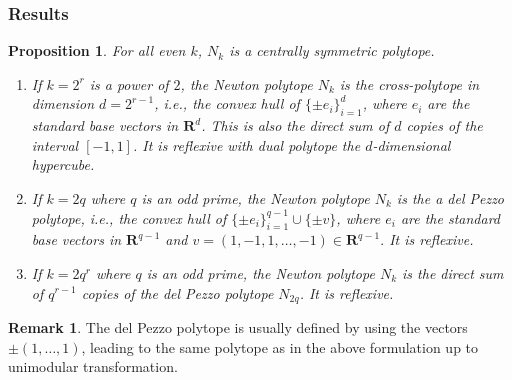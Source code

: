 \documentclass[12pt,reqno]{amsart}
\theoremstyle{definition}
\theoremstyle{plain}
\newtheorem{proposition}[theorem]{Proposition}
\theoremstyle{definition}
\newtheorem{remark}[theorem]{Remark}
\newcommand{\R}{\mathbf{R}}
\begin{document}
\subsubsection*{Results} 

\begin{proposition} \label{polNk} For all even $k$, $N_k$ is a centrally symmetric polytope. 
\begin{enumerate} 
\item If $k=2^r$ is a power of $2$, the Newton polytope $N_k$ is the \emph{cross-polytope} in dimension $d=2^{r-1}$, i.e., the convex hull of $\{\pm e_i\}_ {i=1}^{d}$, where $e_i$ are the standard base vectors in $\R^d$. This is also the direct sum of $d$ copies of the interval $[-1,1]$. It is reflexive with dual polytope the $d$-dimensional hypercube. 

\item \label{DPpol} If $k=2q$ where $q$ is an odd prime, the Newton polytope $N_k$ is the a \emph{del Pezzo polytope}, i.e., the convex hull of $\{\pm e_i\}_ {i=1}^{q-1} \cup \{\pm v\}$, where $e_i$ are the standard base vectors in $\R^{q-1}$ and $v=(1,-1,1,\dots,-1) \in \R^{q-1}.$  It is reflexive. 

\item \label{polNksum} If $k=2q^r$ where $q$ is an odd prime, the Newton polytope $N_k$ is the direct sum of $q^{r-1}$ copies of the del Pezzo polytope $N_{2q}$.  It is reflexive. 
\end{enumerate} 
\end{proposition} 

\begin{remark} 
The del Pezzo polytope is usually defined by using the vectors $\pm(1,\dots,1)$, leading to the same polytope as in the above formulation up to unimodular transformation. 
\end{remark}
\end{document}
